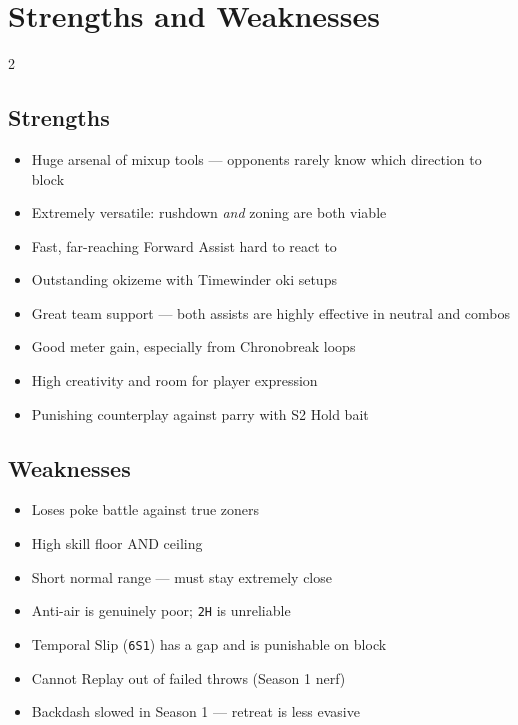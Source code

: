 \documentclass[12pt, a4paper]{report}
\newcommand{\notation}[1]{{\small\texttt{\textcolor{ekkoBlue}{#1}}}}
\begin{document}
\section{Strengths and Weaknesses}

\begin{multicols}{2}

\subsection*{\textcolor{ekkoGreen}{Strengths}}
\begin{itemize}[leftmargin=*]
  \item Huge arsenal of mixup tools --- opponents rarely know which direction to block
  \item Extremely versatile: rushdown \textit{and} zoning are both viable
  \item Fast, far-reaching Forward Assist hard to react to
  \item Outstanding okizeme with Timewinder oki setups
  \item Great team support --- both assists are highly effective in neutral and combos
  \item Good meter gain, especially from Chronobreak loops
  \item High creativity and room for player expression
  \item Punishing counterplay against parry with S2 Hold bait
\end{itemize}

\columnbreak

\subsection*{\textcolor{ekkoRed}{Weaknesses}}
\begin{itemize}[leftmargin=*]
  \item Loses poke battle against true zoners
  \item High skill floor AND ceiling
  \item Short normal range --- must stay extremely close
  \item Anti-air is genuinely poor; \notation{2H} is unreliable
  \item Temporal Slip (\notation{6S1}) has a gap and is punishable on block
  \item Cannot Replay out of failed throws (Season 1 nerf)
  \item Backdash slowed in Season 1 --- retreat is less evasive
\end{itemize}

\end{multicols}
\end{document}
